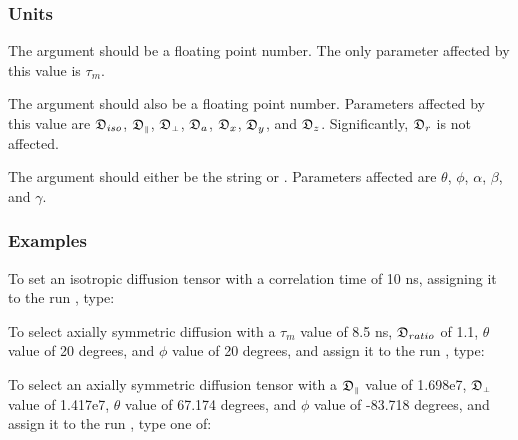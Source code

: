 \subsubsection{Units}

The  argument should be a floating point number.  The only parameter affected by this value is $\tau_m$.


The  argument should also be a floating point number.  Parameters affected by this value are $\mathfrak{D}_{iso}$, $\mathfrak{D}_{\scriptscriptstyle \parallel}$, $\mathfrak{D}_{\scriptscriptstyle \perp}$, $\mathfrak{D}_a$, $\mathfrak{D}_x$, $\mathfrak{D}_y$, and $\mathfrak{D}_z$.  Significantly, $\mathfrak{D}_r$ is not affected.


The  argument should either be the string  or .  Parameters affected are $\theta$, $\phi$, $\alpha$, $\beta$, and $\gamma$.



\subsubsection{Examples}

To set an isotropic diffusion tensor with a correlation time of 10 ns, assigning it to the run , type:






To select axially symmetric diffusion with a $\tau_m$ value of 8.5 ns, $\mathfrak{D}_{ratio}$ of 1.1, $\theta$ value of 20 degrees, and $\phi$ value of 20 degrees, and assign it to the run , type:



To select an axially symmetric diffusion tensor with a $\mathfrak{D}_{\scriptscriptstyle \parallel}$ value of 1.698e7, $\mathfrak{D}_{\scriptscriptstyle \perp}$ value of 1.417e7, $\theta$ value of 67.174 degrees, and $\phi$ value of -83.718 degrees, and assign it to the run , type one of:


